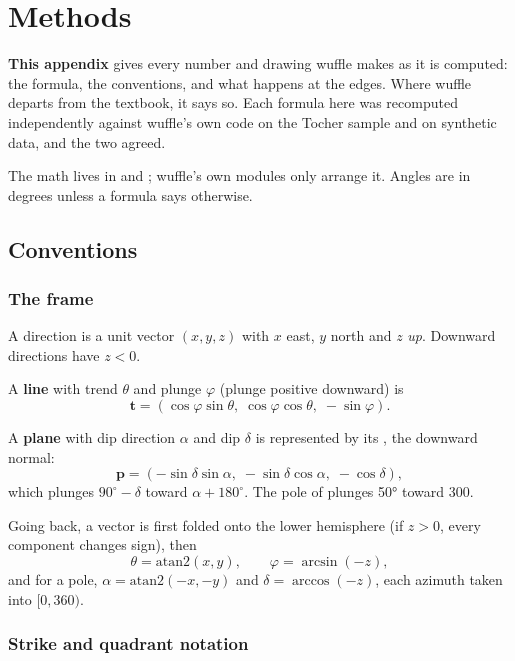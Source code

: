 \chapter{Methods}\label{app:methods}
\begin{goals}
\textbf{This appendix} gives every number and drawing wuffle makes as it is computed: the formula, the
conventions, and what happens at the edges. Where wuffle departs from the textbook, it says so. Each
formula here was recomputed independently against wuffle's own code on the Tocher sample and on
synthetic data, and the two agreed.
\end{goals}

The math lives in  and ; wuffle's own modules only arrange
it. Angles are in degrees unless a formula says otherwise.

\section{Conventions}\label{sec:m-conventions}

\subsection{The frame}

A direction is a unit vector $(x, y, z)$ with $x$ east, $y$ north and $z$ \emph{up}. Downward directions
have $z < 0$.

A \textbf{line} with trend $\theta$ and plunge $\varphi$ (plunge positive downward) is
\[ \mathbf{t} = (\cos\varphi \sin\theta,\; \cos\varphi \cos\theta,\; -\sin\varphi). \]

A \textbf{plane} with dip direction $\alpha$ and dip $\delta$ is represented by its , the
downward normal:
\[ \mathbf{p} = (-\sin\delta \sin\alpha,\; -\sin\delta \cos\alpha,\; -\cos\delta), \]
which plunges $90^\circ - \delta$ toward $\alpha + 180^\circ$. The pole of  plunges 50°
toward 300.

Going back, a vector is first folded onto the lower hemisphere (if $z > 0$, every component changes
sign), then
\[ \theta = \mathrm{atan2}(x, y), \qquad \varphi = \arcsin(-z), \]
and for a pole, $\alpha = \mathrm{atan2}(-x, -y)$ and $\delta = \arccos(-z)$, each azimuth taken into
$[0, 360)$.

\subsection{Strike and quadrant notation}

